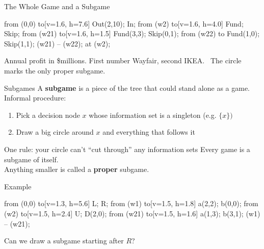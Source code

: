 \begin{frame}{The Whole Game and a Subgame}
\centering
\begin{gametree}[player names={Wayfair, IKEA}, scale=0.72, subgame={depth=9mm}]
  \branch[player=1, root=w, label=90] from (0,0) to[v=1.6, h=7.6] {Out(2,10); In};
  \branch[player=1, label=0] from (w2) to[v=1.6, h=4.0] {Fund; Skip};
  \branch[player=2, label=none] from (w21) to[v=1.6, h=1.5]
    {Fund(3,3); Skip(0,1)};
  \branch from (w22) to {Fund(1,0); Skip(1,1)};
  \informset (w21) -- (w22);
  \subgame[inner sep=4.6ex] at (w2);
\end{gametree}
\bsk
\raggedright
{\footnotesize Annual profit in \$millions. First number Wayfair, second IKEA.}
\ The circle marks the only proper subgame.
\vspace{-0.2in}
\end{frame}

\begin{frame}{Subgames}
A \textbf{subgame} is a piece of the tree that could stand alone as a game.
\bsk
Informal procedure:
\begin{enumerate}
    \item Pick a decision node $x$ whose information set is a singleton (e.g. $\{x\})$
    \item Draw a big circle around $x$ and everything that follows it
\end{enumerate}
\bsk
One rule: your circle can't ``cut through'' any information sets
\vfill
Every game is a subgame of itself.\\ Anything smaller is called a \textbf{proper} subgame.
\vspace{-0.3in}
\end{frame}

\begin{frame}{Example}
\centering
\begin{gametree}[labels=short, scale=0.85]
  \branch[player=1, root=w, label=90] from (0,0) to[v=1.3, h=5.6] {L; R};
  \branch[player=2, label=135] from (w1) to[v=1.5, h=1.8] {a(2,2); b(0,0)};
  \branch[player=1, label=45] from (w2) to[v=1.5, h=2.4] {U; D(2,0)};
  \branch[player=2, label=none] from (w21) to[v=1.5, h=1.6] {a(1,3); b(3,1)};
  \informset[curved=15] (w1) -- (w21);
\end{gametree}
\bsk
\raggedright
Can we draw a subgame starting after $R$?
\vspace{-0.2in}
\end{frame}

